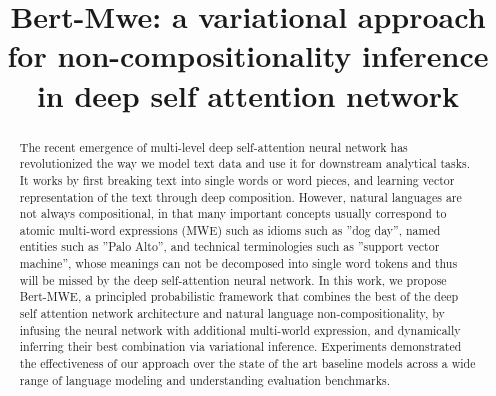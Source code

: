\documentclass[conference]{IEEEtran}
\newcommand{\nop}[1]{}
\newcommand{\BertMWE}{\mbox{\sf Bert-MWE}\xspace}
\begin{document}
\title{
Bert-Mwe: a variational approach for non-compositionality inference in deep self attention network
}

\nop{
\author{Keqian Li}
\affiliation{\institution{University of California at Santa Barbara}}
\email{{klee}@cs.ucsb.edu}

\renewcommand{\shortauthors}{K. Li et al.}
\renewcommand{\shorttitle}{UNEC}
}

\author{
}

\maketitle




\begin{abstract}
The recent emergence of multi-level deep self-attention neural network has revolutionized the way we model text data and use it for downstream analytical tasks. 
It works by first breaking text into single words or word pieces, 
and learning vector representation of the text through deep composition.
However, natural languages are not always compositional, 
in that many important concepts usually correspond to atomic multi-word  expressions (MWE) such as 
idioms such as ”dog day”, named entities such as ”Palo Alto”, and technical terminologies such as ”support vector machine”,
whose meanings can not be decomposed into single word tokens and thus will be missed by the deep self-attention neural network.
In this work, we propose \BertMWE, a  principled probabilistic framework that combines the best of the deep self attention network architecture and natural language non-compositionality, 
by infusing the neural network with additional multi-world expression, and dynamically inferring their best combination via variational inference. Experiments demonstrated the effectiveness of our approach over the state of the art baseline models across a wide range of language modeling and understanding evaluation benchmarks. 
\end{abstract}







\end{document}
